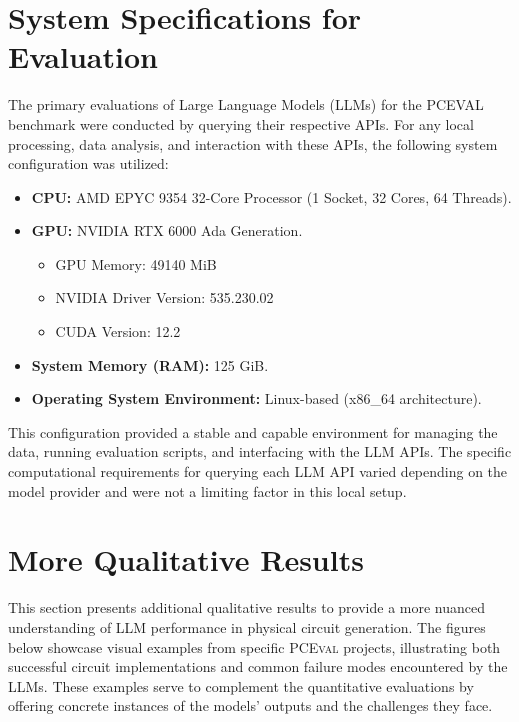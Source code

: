 \documentclass{article} %
\begin{document}
\section{System Specifications for Evaluation}
\label{Appendix:system_specs}

The primary evaluations of Large Language Models (LLMs) for the PCEVAL benchmark were conducted by querying their respective APIs. For any local processing, data analysis, and interaction with these APIs, the following system configuration was utilized:

\begin{itemize}
    \item \textbf{CPU:} AMD EPYC 9354 32-Core Processor (1 Socket, 32 Cores, 64 Threads).
    \item \textbf{GPU:} NVIDIA RTX 6000 Ada Generation.
    \begin{itemize}
        \item GPU Memory: 49140 MiB
        \item NVIDIA Driver Version: 535.230.02
        \item CUDA Version: 12.2
    \end{itemize}
    \item \textbf{System Memory (RAM):} 125 GiB.
    \item \textbf{Operating System Environment:} Linux-based (x86\_64 architecture).
\end{itemize}

This configuration provided a stable and capable environment for managing the data, running evaluation scripts, and interfacing with the LLM APIs.
The specific computational requirements for querying each LLM API varied depending on the model provider and were not a limiting factor in this local setup.


\section{More Qualitative Results}
\label{sec:More Qualitative Results}

This section presents additional qualitative results to provide a more nuanced understanding of LLM performance in physical circuit generation.
The figures below showcase visual examples from specific \textsc{PCEval} projects, illustrating both successful circuit implementations and common failure modes encountered by the LLMs.
These examples serve to complement the quantitative evaluations by offering concrete instances of the models' outputs and the challenges they face.
\end{document}
